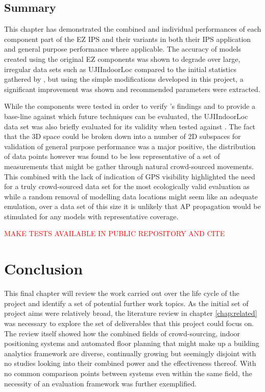 \documentclass{UoYCSproject}
\begin{document}
        \section{Summary}
        
            This chapter has demonstrated the combined and individual performances of each component part of the EZ IPS and their variants in both their IPS application and general purpose performance where applicable. The accuracy of models created using the original EZ components was shown to degrade over large, irregular data sets such as UJIIndoorLoc compared to the initial statistics gathered by \citet{chintalapudi2010indoor}, but using the simple modifications developed in this project, a significant improvement was shown and recommended parameters were extracted.
            
            While the components were tested in order to verify \citeauthor{chintalapudi2010indoor}'s findings and to provide a base-line against which future techniques can be evaluated, the UJIIndoorLoc data set was also briefly evaluated for its validity when tested against \citep{torres2014ujiindoorloc}. The fact that the 3D space could be broken down into a number of 2D subspaces for validation of general purpose performance was a major positive, the distribution of data points however was found to be less representative of a set of measurements that might be gather through natural crowd-sourced movements. This combined with the lack of indication of GPS visibility highlighted the need for a truly crowd-sourced data set for the most ecologically valid evaluation as while a random removal of modelling data locations might seem like an adequate emulation, over a data set of this size it is unlikely that AP propagation would be stimulated for any models with representative coverage.
            
            \textcolor{red}{MAKE TESTS AVAILABLE IN PUBLIC REPOSITORY AND CITE}
	
	\chapter{Conclusion}
    \label{chap:conclusion}
    
        This final chapter will review the work carried out over the life cycle of the project and identify a set of potential further work topics. As the initial set of project aims were relatively broad, the literature review in chapter \ref{chap:related} was necessary to explore the set of deliverables that this project could focus on. The review itself showed how the combined fields of crowd-sourcing, indoor positioning systems and automated floor planning that might make up a building analytics framework are diverse, continually growing but seemingly disjoint with no studies looking into their combined power and the effectiveness thereof. With no common comparison points between systems even within the same field, the necessity of an evaluation framework was further exemplified.
        
\end{document}
